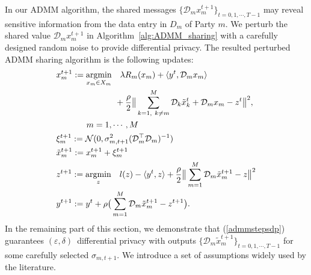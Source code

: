 In our ADMM algorithm, the shared messages $\{\mathcal{D}_mx_m^{t+1}\}_{t=0,1,\cdots,T-1}$ may reveal sensitive information from the data entry in $D_m$ of Party $m$. We perturb the shared value $\mathcal{D}_mx^{t+1}_m$ in Algorithm~\ref{alg:ADMM_sharing} with a carefully designed random noise to provide differential privacy. The resulted perturbed ADMM sharing algorithm is the following updates:
\begin{align}
  &x_{m}^{t+1}:=\underset{x_m\in X_m}{\text{argmin}}\quad\lambda R_m(x_m) + \langle y^t, \mathcal{D}_mx_m\rangle\nonumber\\
  &\quad\quad\quad\quad\quad\quad\quad + \frac{\rho}{2}\big\|\sum_{\substack{k=1,~k\neq m}}^{M}\mathcal{D}_k\tilde{x}_k^{t} + \mathcal{D}_mx_m - z^t\big\|^2, \nonumber\\&\hspace*{36pt} m=1,\cdots,M
  \nonumber\\
  &\xi_m^{t+1}:=\mathcal{N}(0,\sigma_{m,t+1}^2
  (\mathcal{D}_m^\top\mathcal{D}_m)^{-1}
  )\nonumber\\
  &\tilde{x}_m^{t+1}:= x_m^{t+1}+\xi_m^{t+1}\label{admmstepsdp}\\
  &z^{t+1}:=\underset{z}{\text{argmin}}\quad l(z)  - \langle y^t, z \rangle + \frac{\rho}{2} \big\|\sum_{m=1}^{M}\mathcal{D}_m\tilde{x}_m^{t+1} - z\big\|^2\nonumber\\
&y^{t+1}:=y^t + \rho\big(\sum_{m=1}^{M}\mathcal{D}_m\tilde{x}_m^{t+1} - z^{t+1}\big). \nonumber
\end{align}
In the remaining part of this section, we demonstrate that (\ref{admmstepsdp}) guarantees $(\varepsilon, \delta)$~differential privacy with outputs $\{\mathcal{D}_m\tilde{x}_m^{t+1}\}_{t=0,1,\cdots,T-1}$ for some carefully selected $\sigma_{m,t+1}$. We introduce a set of assumptions widely used by the literature.
